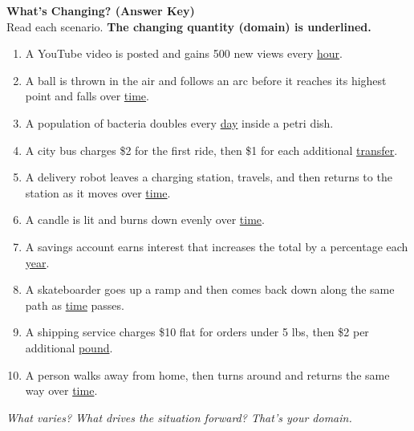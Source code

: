 \documentclass[12pt,landscape]{article}
\begin{document}
\begin{minipage}[t]{0.48\textwidth}
\raggedright

\Large\textbf{What's Changing? (Answer Key)} \\
\normalsize
\vspace{1em}
Read each scenario. \textbf{The changing quantity (domain) is underlined.}

\vspace{1em}
\begin{enumerate}
  \item A YouTube video is posted and gains 500 new views every \underline{hour}.
  \item A ball is thrown in the air and follows an arc before it reaches its highest point and falls over \underline{time}.
  \item A population of bacteria doubles every \underline{day} inside a petri dish.
  \item A city bus charges \$2 for the first ride, then \$1 for each additional \underline{transfer}.
  \item A delivery robot leaves a charging station, travels, and then returns to the station as it moves over \underline{time}.
  \item A candle is lit and burns down evenly over \underline{time}.
  \item A savings account earns interest that increases the total by a percentage each \underline{year}.
  \item A skateboarder goes up a ramp and then comes back down along the same path as \underline{time} passes.
  \item A shipping service charges \$10 flat for orders under 5 lbs, then \$2 per additional \underline{pound}.
  \item A person walks away from home, then turns around and returns the same way over \underline{time}.
\end{enumerate}

\vfill
\small\textit{What varies? What drives the situation forward? That’s your domain.}
\end{minipage}

\newpage
\end{document}
